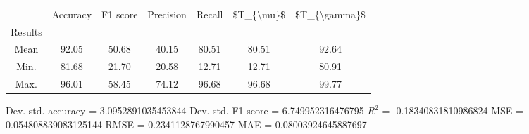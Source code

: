\begin{tabular}{|c|c|c|c|c|c|c|}
\toprule
{} &  Accuracy &  F1 score &  Precision &  Recall &  \$T\_\{\textbackslash mu\}\$ &  \$T\_\{\textbackslash gamma\}\$ \\
Results &           &           &            &         &            &               \\
\hline
Mean    &     92.05 &     50.68 &      40.15 &   80.51 &      80.51 &         92.64 \\
Min.    &     81.68 &     21.70 &      20.58 &   12.71 &      12.71 &         80.91 \\
Max.    &     96.01 &     58.45 &      74.12 &   96.68 &      96.68 &         99.77 \\
\bottomrule
\end{tabular}

 Dev. std. accuracy = 3.0952891035453844
 Dev. std. F1-score = 6.749952316476795
 $R^2$ = -0.18340831810986824
 MSE = 0.054808839083125144
 RMSE = 0.2341128767990457
 MAE = 0.08003924645887697